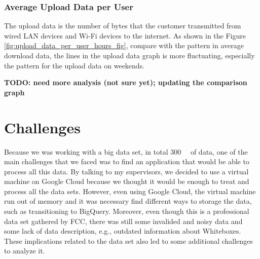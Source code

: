 \documentclass[conference,10pt]{IEEEtran}
\begin{document}
\subsubsection{Average Upload Data per User}
\label{sec:upload-data-per-user-over-hours}

The upload data is the number of bytes that the customer transmitted from wired LAN devices and Wi-Fi devices to the internet. As shown in the Figure \ref{fig:upload_data_per_user_hours_fig}, compare with the pattern in average download data, the lines in the upload data graph is more fluctuating, especially the pattern for the upload data on weekends. 

\textbf{TODO: need more analysis (not sure yet); updating the comparison graph}






\section{Challenges}
\label{sec:challenges}
Because we was working with a big data set, in total \SI{300}{\giga\byte} of data, one of the main challenges that we faced was to find an application that would be able to process all this data. By talking to my supervisors, we decided to use a virtual machine on Google Cloud because we thought it would be enough to treat and process all the data sets. However, even using Google Cloud, the virtual machine run out of memory and it was necessary find different ways to storage the data, such as transitioning to BigQuery. Moreover, even though this is a professional data set gathered by FCC, there was still some invalided and noisy data and some lack of data description, e.g., outdated information about Whiteboxes. These implications related to the data set also led to some additional challenges to analyze it.
\end{document}
